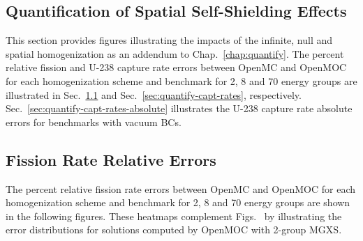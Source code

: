 \begin{appendices}
\chapter{Quantification of Spatial Self-Shielding Effects}
\label{app:quantify-mgxs-shielding}

This section provides figures illustrating the impacts of the infinite, null and spatial homogenization as an addendum to Chap.~\ref{chap:quantify}. The percent relative fission and U-238 capture rate errors between OpenMC and OpenMOC for each homogenization scheme and benchmark for 2, 8 and 70 energy groups are illustrated in Sec.~\ref{sec:quantify-fiss-rates} and Sec.~\ref{sec:quantify-capt-rates}, respectively. Sec.~\ref{sec:quantify-capt-rates-absolute} illustrates the U-238 capture rate absolute errors for benchmarks with vacuum \acp{BC}.

\section{Fission Rate Relative Errors}
\label{sec:quantify-fiss-rates}

The percent relative fission rate errors between OpenMC and OpenMOC for each homogenization scheme and benchmark for 2, 8 and 70 energy groups are shown in the following figures. These heatmaps complement Figs.~ by illustrating the error distributions for solutions computed by OpenMOC with 2-group \ac{MGXS}.


\end{appendices}
